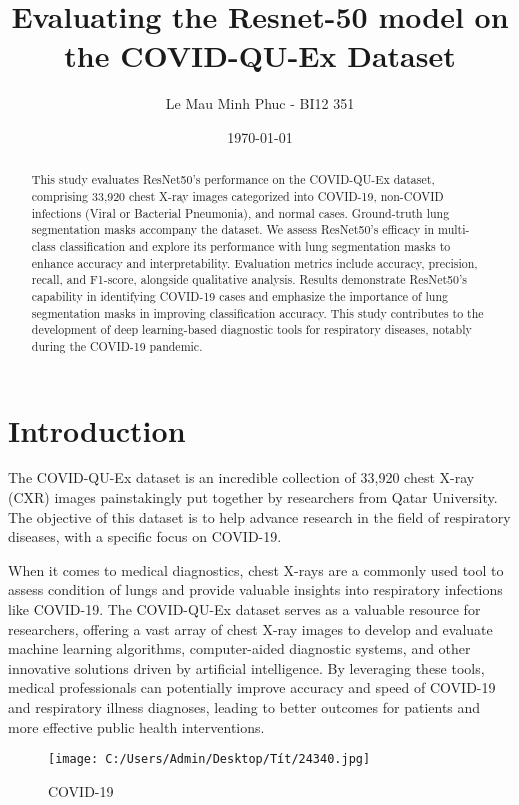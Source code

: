 \documentclass{article}
\title{Evaluating the Resnet-50 model on the COVID-QU-Ex Dataset}
\author{Le Mau Minh Phuc - BI12 351}
\date{\today}
\begin{document}
\maketitle

\begin{abstract}
This study evaluates ResNet50's performance on the COVID-QU-Ex dataset, comprising 33,920 chest X-ray images categorized into COVID-19, non-COVID infections (Viral or Bacterial Pneumonia), and normal cases. Ground-truth lung segmentation masks accompany the dataset. We assess ResNet50's efficacy in multi-class classification and explore its performance with lung segmentation masks to enhance accuracy and interpretability. Evaluation metrics include accuracy, precision, recall, and F1-score, alongside qualitative analysis. Results demonstrate ResNet50's capability in identifying COVID-19 cases and emphasize the importance of lung segmentation masks in improving classification accuracy. This study contributes to the development of deep learning-based diagnostic tools for respiratory diseases, notably during the COVID-19 pandemic.
\end{abstract}
\newpage
\section{Introduction}
The COVID-QU-Ex dataset is an incredible collection of 33,920 chest X-ray (CXR) images painstakingly put together by researchers from Qatar University. The objective of this dataset is to help advance research in the field of respiratory diseases, with a specific focus on COVID-19.

When it comes to medical diagnostics, chest X-rays are a commonly used tool to assess condition of lungs and provide valuable insights into respiratory infections like COVID-19. The COVID-QU-Ex dataset serves as a valuable resource for researchers, offering a vast array of chest X-ray images to develop and evaluate machine learning algorithms, computer-aided diagnostic systems, and other innovative solutions driven by artificial intelligence. By leveraging these tools, medical professionals can potentially improve accuracy and speed of COVID-19 and respiratory illness diagnoses, leading to better outcomes for patients and more effective public health interventions.

\begin{figure}[htbp]
    \centering
    \texttt{[image: C:/Users/Admin/Desktop/Tít/24340.jpg]}
    \caption{COVID-19}
    \label{fig:cov}
\end{figure}
\end{document}
